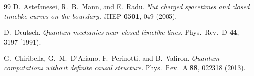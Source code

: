 \documentclass[11pt,a4paper]{article}
\theoremstyle{definition}
\theoremstyle{remark}
\begin{document}
\begin{thebibliography}{99}
 D.\ Astefanesei, R.\ B.\ Mann, and E.\ Radu.
  \emph{Nut charged spacetimes and closed timelike curves on the
  boundary.} JHEP \textbf{0501}, 049 (2005).

 D.\ Deutsch.
  \emph{Quantum mechanics near closed timelike lines.}
  Phys.\ Rev.\ D \textbf{44}, 3197 (1991).

 G.\ Chiribella, G.\ M.\ D'Ariano, P.\ Perinotti,
  and B.\ Valiron.
  \emph{Quantum computations without definite causal structure.}
  Phys.\ Rev.\ A \textbf{88}, 022318 (2013).

\end{thebibliography}
\end{document}
